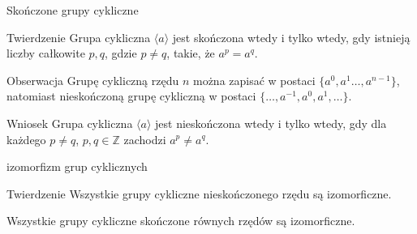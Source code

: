\documentclass{beamer}
\begin{document}
\begin{frame}{Skończone grupy cykliczne}
    \begin{block}{Twierdzenie}
        Grupa cykliczna $\langle a \rangle$ jest skończona wtedy i tylko wtedy, gdy istnieją liczby całkowite $p,q$, gdzie 
        $p \neq q$, takie, że $a^p =a^q$.
    \end{block}
    \pause
    \begin{alertblock}{Obserwacja}
        Grupę cykliczną rzędu $n$ można zapisać w postaci $\{a^0,a^1 \ldots, a^{n-1}\}$, 
        natomiast nieskończoną grupę cykliczną w postaci $\{\ldots, a^{-1}, a^0, a^1, \ldots\}.$
    \end{alertblock}
    \begin{alertblock}{Wniosek}
        Grupa cykliczna $\langle a \rangle$ jest nieskończona wtedy i tylko wtedy, gdy dla każdego $p \neq q$, $p,q \in \mathbb{Z}$
        zachodzi $a^p \neq a^q$.
    \end{alertblock}
\end{frame}

\begin{frame}{izomorfizm grup cyklicznych}
    \begin{block}{Twierdzenie}
        Wszystkie grupy cykliczne nieskończonego rzędu są izomorficzne.
        
        Wszystkie grupy cykliczne skończone równych rzędów są izomorficzne.
    \end{block}
\end{frame}
\end{document}
